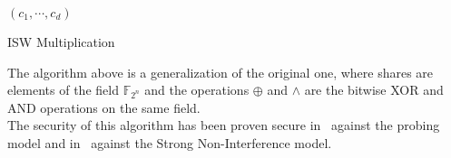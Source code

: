 \begin{algorithm}
    \SetAlgoLined
    \BlankLine
    \BlankLine


    \Return$(c_1, \cdots, c_d)$
    
    \caption{ISW Multiplication}
\end{algorithm}

The algorithm above is a generalization of the original one, where shares are elements of the field $\mathds{F}_{2^n}$ and the operations $\oplus$ and $\wedge$ are the bitwise XOR and AND operations on the same field.\\
The security of this algorithm has been proven secure in~\cite{rivain2010provably} against the probing model and in~\cite{barthe2016strong} against the Strong Non-Interference model.


